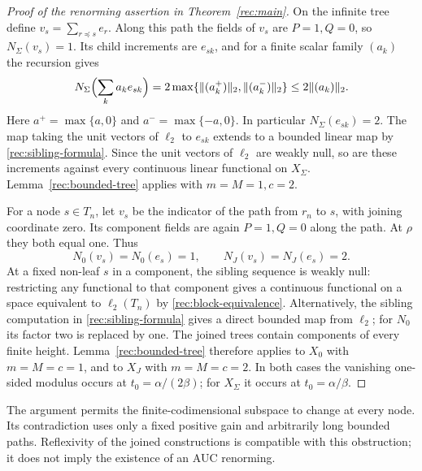 \begin{proof}[Proof of the renorming assertion in Theorem~\ref{rec:main}]
On the infinite tree define
$v_s=\sum_{r\preceq s}e_r$. Along this path the fields of $v_s$ are
$P=1,Q=0$, so $N_\Sigma(v_s)=1$. Its child increments are $e_{sk}$,
and for a finite scalar family $(a_k)$ the recursion gives
\begin{equation}\label{rec:sibling-formula}
 N_\Sigma\Bigl(\sum_k a_ke_{sk}\Bigr)
 =2\max\{\|(a_k^+)\|_2,\|(a_k^-)\|_2\}
 \le2\|(a_k)\|_2.
\end{equation}
Here $a^+=\max\{a,0\}$ and $a^-=\max\{-a,0\}$.
In particular $N_\Sigma(e_{sk})=2$.
The map taking the unit vectors of $\ell_2$ to $e_{sk}$ extends to a
bounded linear map by \eqref{rec:sibling-formula}. Since the unit vectors
of $\ell_2$ are weakly null, so are these increments against every
continuous linear functional on $X_\Sigma$.
Lemma~\ref{rec:bounded-tree} applies with $m=M=1,c=2$.

For a node $s\in T_n$, let $v_s$ be the indicator of the path from
$r_n$ to $s$, with joining coordinate zero. Its component fields are
again $P=1,Q=0$ along the path. At $\rho$ they both equal one. Thus
\[
 N_0(v_s)=N_0(e_s)=1,\qquad N_J(v_s)=N_J(e_s)=2.
\]
At a fixed non-leaf $s$ in a component, the sibling sequence is weakly
null: restricting any functional to that component gives a continuous
functional on a space equivalent to $\ell_2(T_n)$ by
\eqref{rec:block-equivalence}. Alternatively, the sibling computation
in \eqref{rec:sibling-formula} gives a direct bounded map from $\ell_2$;
for $N_0$ its factor two is replaced by one.
The joined trees contain components of every finite height.
Lemma~\ref{rec:bounded-tree} therefore applies to $X_0$ with
$m=M=c=1$, and to $X_J$ with $m=M=c=2$.
In both cases the vanishing one-sided modulus occurs at
$t_0=\alpha/(2\beta)$; for $X_\Sigma$ it occurs at
$t_0=\alpha/\beta$.
\end{proof}

The argument permits the finite-codimensional subspace to change at
every node. Its contradiction uses only a fixed positive gain and
arbitrarily long bounded paths. Reflexivity of the joined constructions
is compatible with this obstruction; it does not imply the existence
of an AUC renorming.

